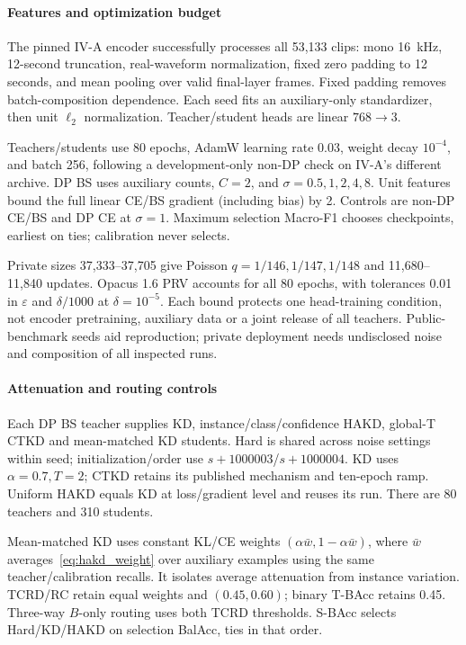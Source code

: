 \paragraph*{Features and optimization budget}
The pinned IV-A encoder successfully processes all 53,133 clips: mono 16~kHz, 12-second truncation, real-waveform normalization, fixed zero padding to 12 seconds, and mean pooling over valid final-layer frames. Fixed padding removes batch-composition dependence. Each seed fits an auxiliary-only standardizer, then unit $\ell_2$ normalization. Teacher/student heads are linear $768\to3$.

Teachers/students use 80 epochs, AdamW learning rate 0.03, weight decay $10^{-4}$, and batch 256, following a development-only non-DP check on IV-A's different archive. DP BS uses auxiliary counts, $C=2$, and $\sigma=0.5,1,2,4,8$. Unit features bound the full linear CE/BS gradient (including bias) by 2. Controls are non-DP CE/BS and DP CE at $\sigma=1$. Maximum selection Macro-F1 chooses checkpoints, earliest on ties; calibration never selects.

Private sizes 37,333--37,705 give Poisson $q=1/146,1/147,1/148$ and 11,680--11,840 updates. Opacus 1.6 PRV accounts for all 80 epochs, with tolerances 0.01 in $\varepsilon$ and $\delta/1000$ at $\delta=10^{-5}$. Each bound protects one head-training condition, not encoder pretraining, auxiliary data or a joint release of all teachers. Public-benchmark seeds aid reproduction; private deployment needs undisclosed noise and composition of all inspected runs.

\paragraph*{Attenuation and routing controls}
Each DP BS teacher supplies KD, instance/class/confidence HAKD, global-T CTKD and mean-matched KD students. Hard is shared across noise settings within seed; initialization/order use $s+1000003$/$s+1000004$. KD uses $\alpha=0.7,T=2$; CTKD retains its published mechanism and ten-epoch ramp. Uniform HAKD equals KD at loss/gradient level and reuses its run. There are 80 teachers and 310 students.

Mean-matched KD uses constant KL/CE weights $(\alpha\bar w,1-\alpha\bar w)$, where $\bar w$ averages~\eqref{eq:hakd_weight} over auxiliary examples using the same teacher/calibration recalls. It isolates average attenuation from instance variation. TCRD/RC retain equal weights and $(0.45,0.60)$; binary T-BAcc retains 0.45. Three-way $B$-only routing uses both TCRD thresholds. S-BAcc selects Hard/KD/HAKD on selection BalAcc, ties in that order.

